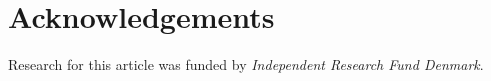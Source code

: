 \section{Acknowledgements}
\label{paper2:acknowledgements}

Research for this article was funded by \textit{Independent Research Fund Denmark}.